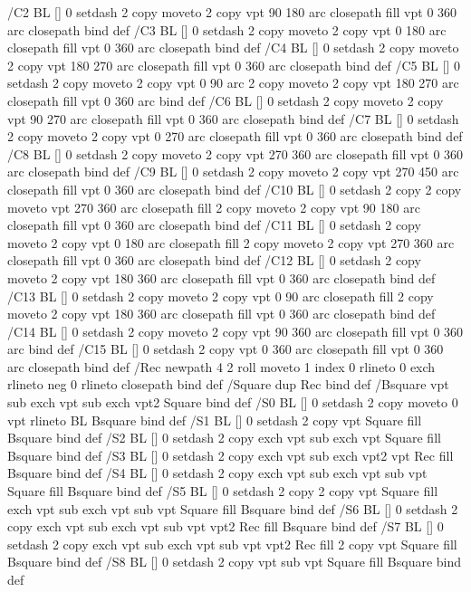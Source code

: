 /C2 {BL [] 0 setdash 2 copy moveto
	2 copy vpt 90 180 arc closepath fill
	vpt 0 360 arc closepath} bind def
/C3 {BL [] 0 setdash 2 copy moveto
	2 copy vpt 0 180 arc closepath fill
	vpt 0 360 arc closepath} bind def
/C4 {BL [] 0 setdash 2 copy moveto
	2 copy vpt 180 270 arc closepath fill
	vpt 0 360 arc closepath} bind def
/C5 {BL [] 0 setdash 2 copy moveto
	2 copy vpt 0 90 arc
	2 copy moveto
	2 copy vpt 180 270 arc closepath fill
	vpt 0 360 arc} bind def
/C6 {BL [] 0 setdash 2 copy moveto
	2 copy vpt 90 270 arc closepath fill
	vpt 0 360 arc closepath} bind def
/C7 {BL [] 0 setdash 2 copy moveto
	2 copy vpt 0 270 arc closepath fill
	vpt 0 360 arc closepath} bind def
/C8 {BL [] 0 setdash 2 copy moveto
	2 copy vpt 270 360 arc closepath fill
	vpt 0 360 arc closepath} bind def
/C9 {BL [] 0 setdash 2 copy moveto
	2 copy vpt 270 450 arc closepath fill
	vpt 0 360 arc closepath} bind def
/C10 {BL [] 0 setdash 2 copy 2 copy moveto vpt 270 360 arc closepath fill
	2 copy moveto
	2 copy vpt 90 180 arc closepath fill
	vpt 0 360 arc closepath} bind def
/C11 {BL [] 0 setdash 2 copy moveto
	2 copy vpt 0 180 arc closepath fill
	2 copy moveto
	2 copy vpt 270 360 arc closepath fill
	vpt 0 360 arc closepath} bind def
/C12 {BL [] 0 setdash 2 copy moveto
	2 copy vpt 180 360 arc closepath fill
	vpt 0 360 arc closepath} bind def
/C13 {BL [] 0 setdash 2 copy moveto
	2 copy vpt 0 90 arc closepath fill
	2 copy moveto
	2 copy vpt 180 360 arc closepath fill
	vpt 0 360 arc closepath} bind def
/C14 {BL [] 0 setdash 2 copy moveto
	2 copy vpt 90 360 arc closepath fill
	vpt 0 360 arc} bind def
/C15 {BL [] 0 setdash 2 copy vpt 0 360 arc closepath fill
	vpt 0 360 arc closepath} bind def
/Rec {newpath 4 2 roll moveto 1 index 0 rlineto 0 exch rlineto
	neg 0 rlineto closepath} bind def
/Square {dup Rec} bind def
/Bsquare {vpt sub exch vpt sub exch vpt2 Square} bind def
/S0 {BL [] 0 setdash 2 copy moveto 0 vpt rlineto BL Bsquare} bind def
/S1 {BL [] 0 setdash 2 copy vpt Square fill Bsquare} bind def
/S2 {BL [] 0 setdash 2 copy exch vpt sub exch vpt Square fill Bsquare} bind def
/S3 {BL [] 0 setdash 2 copy exch vpt sub exch vpt2 vpt Rec fill Bsquare} bind def
/S4 {BL [] 0 setdash 2 copy exch vpt sub exch vpt sub vpt Square fill Bsquare} bind def
/S5 {BL [] 0 setdash 2 copy 2 copy vpt Square fill
	exch vpt sub exch vpt sub vpt Square fill Bsquare} bind def
/S6 {BL [] 0 setdash 2 copy exch vpt sub exch vpt sub vpt vpt2 Rec fill Bsquare} bind def
/S7 {BL [] 0 setdash 2 copy exch vpt sub exch vpt sub vpt vpt2 Rec fill
	2 copy vpt Square fill Bsquare} bind def
/S8 {BL [] 0 setdash 2 copy vpt sub vpt Square fill Bsquare} bind def
